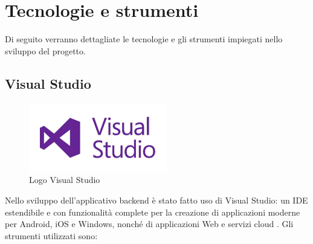 \chapter{Tecnologie e strumenti}
\label{chap:tecnologie_strumenti}
Di seguito verranno dettagliate le tecnologie e gli strumenti impiegati nello sviluppo del progetto.
\section{Visual Studio}
\begin{figure}[h!]
\begin{center}
  \includegraphics[width=6cm]{images/logoVS.jpeg}
  \caption{Logo Visual Studio}\label{fig:VisualStudio}
\end{center}
\end{figure}
Nello sviluppo dell'applicativo backend è stato fatto uso di Visual Studio: un IDE estendibile e con funzionalità complete per la creazione di applicazioni moderne per Android, iOS e Windows, nonché di applicazioni Web e servizi cloud \cite{VS}. Gli strumenti utilizzati sono:
